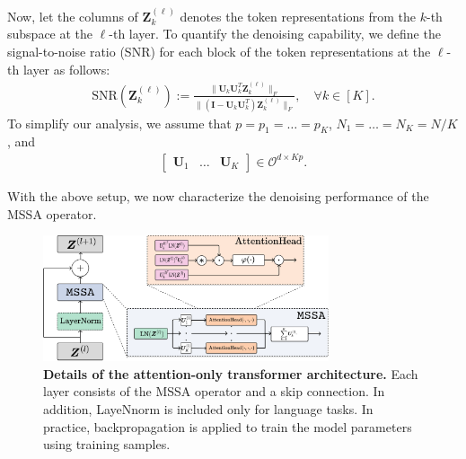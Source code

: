 \documentclass[../../book-main.tex]{subfiles}
\begin{document}
Now, let the columns of $\bm Z_k^{(\ell)}$ denotes the token representations from the $k$-th subspace at the $\ell$-th layer. To quantify the denoising capability, we define the signal-to-noise ratio (SNR) for each block of the token representations at the $\ell$-th layer as follows: 
\begin{align}\label{def:SNR}
\mathrm{SNR}(\bm Z_k^{(\ell)}) :=  \frac{\|\bm U_k\bm U_k^T\bm Z_k^{(\ell)} \|_F}{\|(\bm I - \bm U_k\bm U_k^T)\bm Z_k^{(\ell)} \|_F},\quad \forall k \in [K].
\end{align}
To simplify our analysis, we assume that $p=p_1=\dots=p_K$, $N_1=\dots=N_K=N/K$, and 
\begin{align}\label{eq:orth}
\begin{bmatrix}
\bm U_1 & \dots & \bm U_K
\end{bmatrix} \in \mathcal{O}^{d\times Kp}. 
\end{align}  

With the above setup, we now characterize the denoising performance of the MSSA operator.

\begin{figure}[t]
\begin{center}
        \includegraphics[width=0.75\textwidth]{figs_chap4/MSSA.png}
    \caption{\textbf{Details of the attention-only transformer architecture.} Each layer consists of the MSSA operator and a skip connection. In addition, LayeNnorm is included only for language tasks. In practice, backpropagation is applied to train the model parameters using training samples. %
    }\label{fig:transformer}
\end{center} 
\end{figure}
\end{document}
